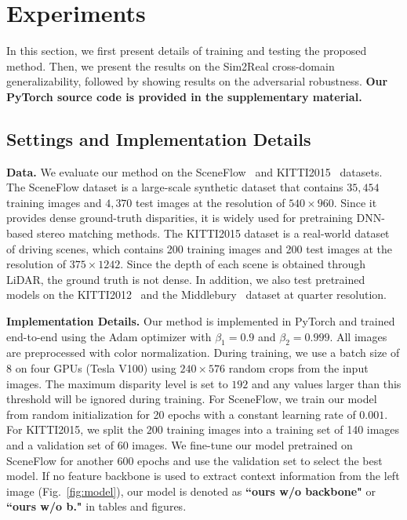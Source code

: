 \documentclass[10pt,twocolumn,letterpaper]{article}
\begin{document}
\section{Experiments}
In this section, we first present details of training and testing the proposed method. Then, we present the results on the Sim2Real cross-domain generalizability, followed by showing results on the adversarial robustness. \textbf{Our PyTorch source code is provided in the supplementary material.}

\subsection{Settings and Implementation Details}
\textbf{Data.} We evaluate our method on the SceneFlow~\cite{dispnet16} and KITTI2015~\cite{Menze2015CVPR} datasets. The SceneFlow dataset is a large-scale synthetic dataset that contains $35,454$ training images and $4,370$ test images at the resolution of $540\times960$. Since it provides dense ground-truth disparities, it is widely used for pretraining DNN-based stereo matching methods. The KITTI2015 dataset is a real-world dataset of driving scenes, which contains 200 training images and 200 test images at the resolution of $375\times1242$. Since the depth of each scene is obtained through LiDAR, the ground truth is not dense. In addition, we also test pretrained models on the KITTI2012~\cite{Geiger2012CVPR} and the Middlebury~\cite{scharstein2014high} dataset at quarter resolution.



\textbf{Implementation Details.} Our method is implemented in PyTorch and trained end-to-end using the Adam optimizer with $\beta_1=0.9$ and $\beta_2=0.999$. All images are preprocessed with color normalization. During training, we use a batch size of 8 on four GPUs (Tesla V100) using $240\times576$ random crops from the input images. The maximum disparity level is set to $192$ and any values larger than this threshold will be ignored during training. 
For SceneFlow, we train our model from random initialization for 20 epochs with a constant learning rate of $0.001$. For KITTI2015, we split the $200$ training images into a training set of 140 images and a validation set of 60 images. We fine-tune our model pretrained on SceneFlow for another 600 epochs and use the validation set to select the best model. If no feature backbone is used to extract context information from the left image (Fig.~\ref{fig:model}), our model is denoted as \textbf{``ours w/o backbone"} or \textbf{``ours w/o b."} in tables and figures. 
\end{document}
